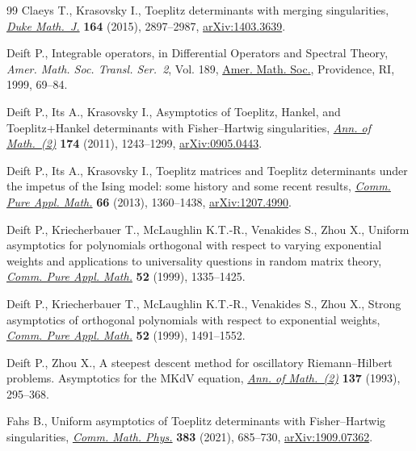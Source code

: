 \documentclass[pdftex]{sigma}
\numberwithin{equation}{section}
\begin{document}
\begin{thebibliography}{99}
Claeys T., Krasovsky I., Toeplitz determinants with merging singularities,
 \href{https://doi.org/10.1215/00127094-3164897}{\textit{Duke Math.~J.}} \textbf{164} (2015), 2897--2987, \href{https://arxiv.org/abs/1403.3639}{arXiv:1403.3639}.

Deift P., Integrable operators, in Differential {O}perators and {S}pectral
 {T}heory, \textit{Amer. Math. Soc. Transl. Ser.~2}, Vol. 189, \href{https://doi.org/10.1090/trans2/189/06}{Amer. Math.
 Soc.}, Providence, RI, 1999, 69--84.

Deift P., Its A., Krasovsky I., Asymptotics of {T}oeplitz, {H}ankel, and
 {T}oeplitz+{H}ankel determinants with {F}isher--{H}artwig singularities,
 \href{https://doi.org/10.4007/annals.2011.174.2.12}{\textit{Ann. of Math.~(2)}} \textbf{174} (2011), 1243--1299,
 \href{https://arxiv.org/abs/0905.0443}{arXiv:0905.0443}.

Deift P., Its A., Krasovsky I., Toeplitz matrices and {T}oeplitz determinants
 under the impetus of the {I}sing model: some history and some recent results,
 \href{https://doi.org/10.1002/cpa.21467}{\textit{Comm. Pure Appl. Math.}} \textbf{66} (2013), 1360--1438,
 \href{https://arxiv.org/abs/1207.4990}{arXiv:1207.4990}.


Deift P., Kriecherbauer T., McLaughlin K.T.-R., Venakides S., Zhou X., Uniform
 asymptotics for polynomials orthogonal with respect to varying exponential
 weights and applications to universality questions in random matrix theory,
 \href{https://doi.org/10.1002/(SICI)1097-0312(199911)52:11<1335::AID-CPA1>3.0.CO;2-1}{\textit{Comm. Pure Appl. Math.}} \textbf{52} (1999), 1335--1425.

Deift P., Kriecherbauer T., McLaughlin K.T.-R., Venakides S., Zhou X., Strong
 asymptotics of orthogonal polynomials with respect to exponential weights,
 \href{https://doi.org/10.1002/(SICI)1097-0312(199912)52:12<1491::AID-CPA2>3.3.CO;2-R}{\textit{Comm. Pure Appl. Math.}} \textbf{52} (1999), 1491--1552.
 
Deift P., Zhou X., A steepest descent method for oscillatory
 {R}iemann--{H}ilbert problems. {A}symptotics for the {MK}d{V} equation,
 \href{https://doi.org/10.2307/2946540}{\textit{Ann. of Math.~(2)}} \textbf{137} (1993), 295--368.

Fahs B., Uniform asymptotics of {T}oeplitz determinants with
 {F}isher--{H}artwig singularities, \href{https://doi.org/10.1007/s00220-021-03943-0}{\textit{Comm. Math. Phys.}} \textbf{383}
 (2021), 685--730, \href{https://arxiv.org/abs/1909.07362}{arXiv:1909.07362}.


\end{thebibliography}
\end{document}
